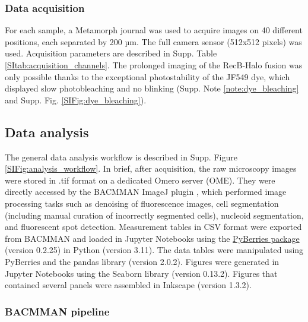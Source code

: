 \subsubsection*{Data acquisition}
For each sample, a Metamorph journal was used to acquire images on 40 different positions, each separated by 200 µm. The full camera sensor (512x512 pixels) was used. Acquisition parameters are described in Supp. Table \ref{SItab:acquisition_channels}. The prolonged imaging of the RecB-Halo fusion was only possible thanks to the exceptional photostability of the JF549 dye, which displayed slow photobleaching and no blinking (Supp. Note \ref{note:dye_bleaching} and Supp. Fig. \ref{SIFig:dye_bleaching}).

\subsection*{Data analysis}
The general data analysis workflow is described in Supp. Figure \ref{SIFig:analysis_workflow}. In brief, after acquisition, the raw microscopy images were stored in .tif format on a dedicated Omero server (OME). They were directly accessed by the BACMMAN ImageJ plugin \cite{Ollion2019}, which performed image processing tasks such as denoising of fluorescence images, cell segmentation (including manual curation of incorrectly segmented cells), nucleoid segmentation, and fluorescent spot detection. Measurement tables in CSV format were exported from BACMMAN and loaded in Jupyter Notebooks using the \href{https://gitlab.com/MEKlab/pyberries}{PyBerries package} (version 0.2.25) in Python (version 3.11). The data tables were manipulated using PyBerries and the pandas library (version 2.0.2). Figures were generated in Jupyter Notebooks using the Seaborn library (version 0.13.2). Figures that contained several panels were assembled in Inkscape (version 1.3.2).

\subsubsection*{BACMMAN pipeline}
